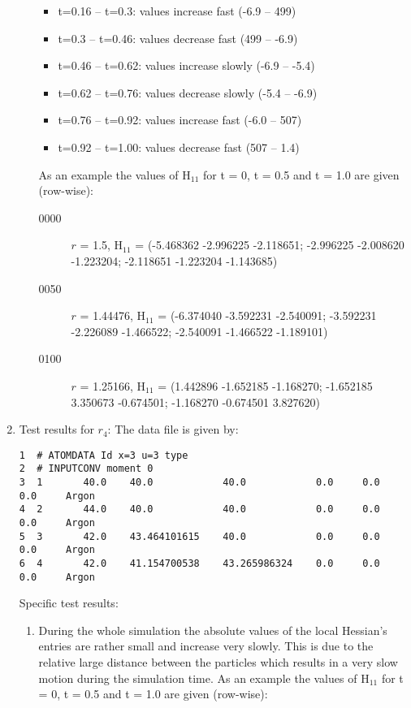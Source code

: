 \documentclass[a4paper]{article}
\begin{document}
\begin{enumerate}
\begin{enumerate}
\begin{itemize}
\item t=0.16 -- t=0.3: values increase fast (-6.9 -- 499)
\item t=0.3 -- t=0.46: values decrease fast (499 -- -6.9)
\item t=0.46 -- t=0.62: values increase slowly (-6.9 -- -5.4)
\item t=0.62 -- t=0.76: values decrease slowly (-5.4 -- -6.9)
\item t=0.76 -- t=0.92: values increase fast (-6.0 -- 507)
\item t=0.92 -- t=1.00: values decrease fast (507 -- 1.4)
\end{itemize}
As an example the values of H$_{\text{11}}$ for t = 0, t = 0.5 and t = 1.0 are given (row-wise):
\begin{description}
\item[{0000}] \(r\) = 1.5, H$_{\text{11}}$ = (-5.468362 -2.996225 -2.118651; -2.996225 -2.008620 -1.223204; -2.118651 -1.223204 -1.143685)
\item[{0050}] \(r\) = 1.44476, H$_{\text{11}}$ = (-6.374040 -3.592231 -2.540091; -3.592231 -2.226089 -1.466522; -2.540091 -1.466522 -1.189101)
\item[{0100}] \(r\) = 1.25166, H$_{\text{11}}$ = (1.442896 -1.652185 -1.168270; -1.652185 3.350673 -0.674501; -1.168270 -0.674501 3.827620)
\end{description}
\end{enumerate}
\item Test results for \(r_4\):
\label{sec-1-6-1-7}
The data file is given by:
\begin{verbatim}
1  # ATOMDATA Id x=3 u=3 type
2  # INPUTCONV moment 0
3  1       40.0    40.0            40.0            0.0     0.0     0.0     Argon
4  2       44.0    40.0            40.0            0.0     0.0     0.0     Argon
5  3       42.0    43.464101615    40.0            0.0     0.0     0.0     Argon
6  4       42.0    41.154700538    43.265986324    0.0     0.0     0.0     Argon
\end{verbatim}
Specific test results:
\begin{enumerate}
\item During the whole simulation the absolute values of the local Hessian's entries are rather small and increase very slowly.
This is due to the relative large distance between the particles which results in a very slow motion during the simulation time.
As an example the values of H$_{\text{11}}$ for t = 0, t = 0.5 and t = 1.0 are given (row-wise):
\begin{description}

\end{description}
\end{enumerate}
\end{enumerate}
\end{document}
